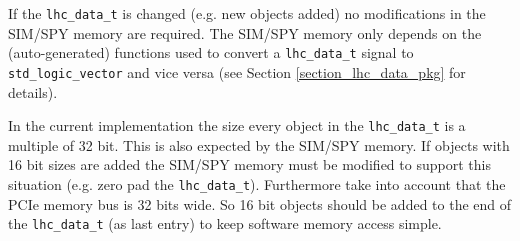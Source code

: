 If the \texttt{lhc\_data\_t} is changed (e.g. new objects added) no modifications in the SIM/SPY memory are required. The SIM/SPY memory only depends on the (auto-generated)
functions used to convert a \texttt{lhc\_data\_t} signal to \texttt{std\_logic\_vector} and vice versa (see Section \ref{section_lhc_data_pkg} for details).

In the current implementation the size every object in the \texttt{lhc\_data\_t} is a multiple of 32 bit. This is also expected by the SIM/SPY memory. If objects with 16 bit sizes
are added the SIM/SPY memory must be modified to support this situation (e.g. zero pad the \texttt{lhc\_data\_t}). Furthermore take into account that the PCIe memory bus is 32 bits wide.
So 16 bit objects should be added to the end of the \texttt{lhc\_data\_t} (as last entry) to keep software memory access simple.


